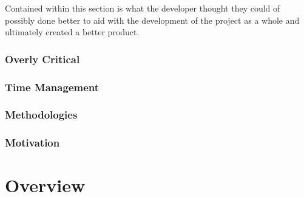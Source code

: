 Contained within this section is what the developer thought they could of possibly done better to aid with the development of the project as a whole and ultimately created a better product. 

\subsubsection{Overly Critical}

\subsubsection{Time Management}

\subsubsection{Methodologies}

\subsubsection{Motivation}


\section{Overview}

